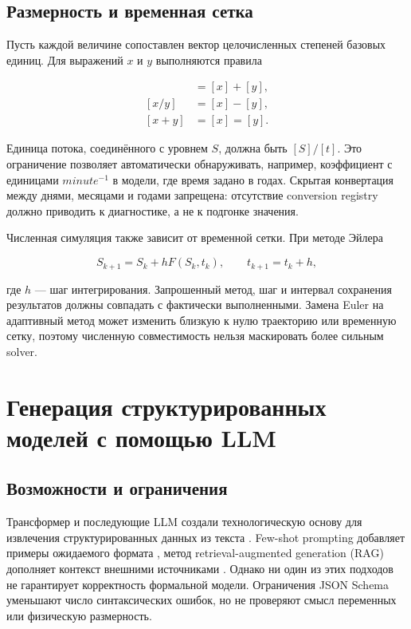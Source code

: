 \subsection{Размерность и временная сетка}

Пусть каждой величине сопоставлен вектор целочисленных степеней базовых единиц. Для выражений $x$ и $y$ выполняются правила

\begin{align}
    [xy]&=[x]+[y],\\
    [x/y]&=[x]-[y],\\
    [x+y]&=[x]=[y].
\end{align}

Единица потока, соединённого с уровнем $S$, должна быть $[S]/[t]$. Это ограничение позволяет автоматически обнаруживать, например, коэффициент с единицами $minute^{-1}$ в модели, где время задано в годах. Скрытая конвертация между днями, месяцами и годами запрещена: отсутствие conversion registry должно приводить к диагностике, а не к подгонке значения.

Численная симуляция также зависит от временной сетки. При методе Эйлера

\begin{equation}
    S_{k+1}=S_k+hF(S_k,t_k),\qquad t_{k+1}=t_k+h,
    \label{eq:euler}
\end{equation}

где $h$ --- шаг интегрирования. Запрошенный метод, шаг и интервал сохранения результатов должны совпадать с фактически выполненными. Замена Euler на адаптивный метод может изменить близкую к нулю траекторию или временную сетку, поэтому численную совместимость нельзя маскировать более сильным solver.

\section{Генерация структурированных моделей с помощью LLM}

\subsection{Возможности и ограничения}

Трансформер и последующие LLM создали технологическую основу для извлечения структурированных данных из текста \cite{vaswani2017attention}. Few-shot prompting добавляет примеры ожидаемого формата \cite{brown2020gpt3}, метод retrieval-augmented generation (RAG) дополняет контекст внешними источниками \cite{lewis2020retrieval}. Однако ни один из этих подходов не гарантирует корректность формальной модели. Ограничения JSON Schema уменьшают число синтаксических ошибок, но не проверяют смысл переменных или физическую размерность.


